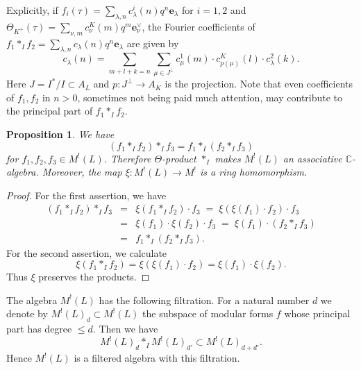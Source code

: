 \documentclass[12pt]{amsart}
\numberwithin{equation}{section}
\newtheorem{proposition}[theorem]{Proposition}
\theoremstyle{definition}
\theoremstyle{remark}
\newcommand{\C}{\mathbb{C}}
\newcommand{\elambda}{{\mathbf e}_{\lambda}}
\newcommand{\ThetaK}{\Theta_{K^{+}}}
\newcommand{\ML}{M^{!}(L)}
\begin{document}
Explicitly, if 
$f_{i}(\tau)=\sum_{\lambda, n}c_{\lambda}^{i}(n)q^{n}{\elambda}$ 
for $i=1, 2$ and 
${\ThetaK}(\tau)=\sum_{\nu, m} c_{\nu}^{K}(m)q^{m}\mathbf{e}_{\nu}^{\vee}$, 
the Fourier coefficients of 
$f_{1}\ast_{I}f_{2}=\sum_{\lambda, n}c_{\lambda}(n)q^{n}{\elambda}$ 
are given by 
\begin{equation*}
c_{\lambda}(n) = 
\sum_{m+l+k=n}\sum_{\mu\in J^{\perp}} 
c^{1}_{\mu}(m) \cdot c^{K}_{p(\mu)}(l) \cdot c^{2}_{\lambda}(k). 
\end{equation*}
Here 
$J=I^{\ast}/I\subset A_{L}$ 
and $p:J^{\perp}\to A_{K}$ is the projection. 
Note that even coefficients of $f_1, f_2$ in $n>0$, 
sometimes not being paid much attention, 
may contribute to the principal part of $f_1\ast_{I} f_2$. 


\begin{proposition}\label{prop: associativity et al}
We have 
%
%
\begin{equation*}
(f_1\ast_{I} f_2)\ast_{I} f_3 = f_1\ast_{I}(f_2\ast_{I} f_3) 
\end{equation*}
for $f_1, f_2, f_3 \in {\ML}$. 
Therefore $\Theta$-product $\ast_{I}$ makes ${\ML}$ an associative ${\C}$-algebra. 
Moreover, the map $\xi \colon {\ML}\to M^{!}$ is a ring homomorphism.  
%
\end{proposition}

\begin{proof}
For the first assertion, we have 
\begin{eqnarray*}
(f_1\ast_{I} f_2)\ast_{I} f_3 
& =  & 
\xi(f_1\ast_{I}f_2) \cdot f_3  
\; = \; \xi(\xi(f_1) \cdot f_2) \cdot f_3 \\  
& = & 
\xi(f_1) \cdot \xi(f_2) \cdot f_3  
\; = \; \xi(f_1) \cdot (f_2 \ast_{I} f_3) \\
& = & 
f_{1}\ast_{I} (f_2 \ast_{I} f_3). 
\end{eqnarray*}
For the second assertion, we calculate  
\begin{equation*}
\xi(f_{1} \ast_{I} f_{2}) = 
\xi(\xi(f_{1})\cdot f_{2}) = 
\xi(f_{1})\cdot \xi(f_{2}).  
\end{equation*}
Thus $\xi$ preserves the products. 
\end{proof}
  

The algebra ${\ML}$ has the following filtration. 
For a natural number $d$ we denote by 
$M^{!}(L)_{d}\subset {\ML}$ 
the subspace of modular forms $f$ 
whose principal part has degree $\leq d$. 
Then we have 
\begin{equation*}
M^{!}(L)_{d} \ast_{I} M^{!}(L)_{d'} \subset M^{!}(L)_{d+d'}. 
\end{equation*}
Hence ${\ML}$ is a filtered algebra with this filtration. 
\end{document}
